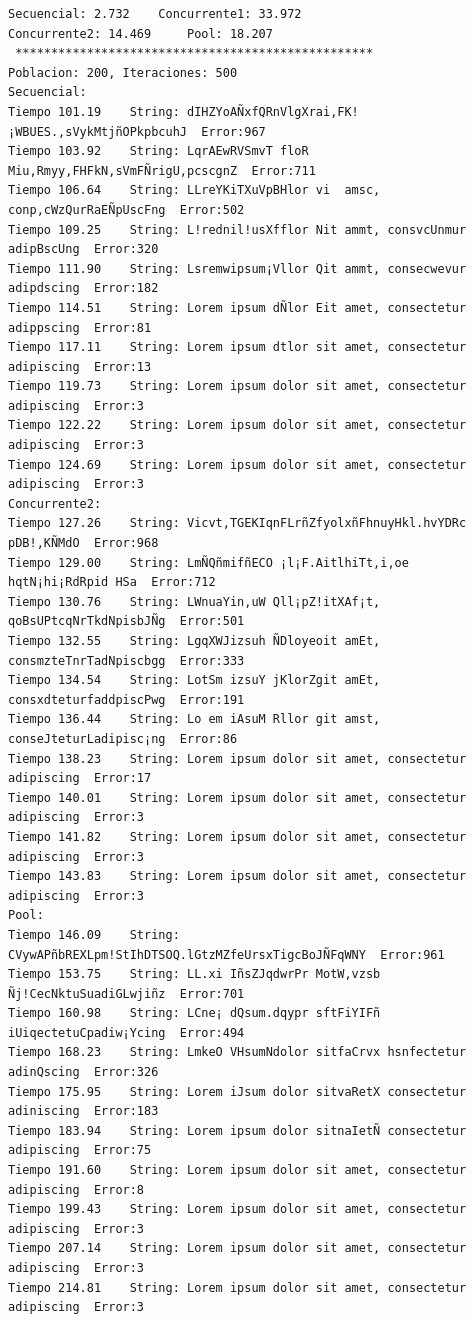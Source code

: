 \documentclass[a4paper,twocolumn,10pt]{article}
\begin{document}
\begin{center}
{\begin{verbatim}
Secuencial: 2.732	 Concurrente1: 33.972
Concurrente2: 14.469	 Pool: 18.207 
 **************************************************
Poblacion: 200, Iteraciones: 500
Secuencial:
Tiempo 101.19	 String: dIHZYoAÑxfQRnVlgXrai,FK! ¡WBUES.,sVykMtjñOPkpbcuhJ	 Error:967
Tiempo 103.92	 String: LqrAEwRVSmvT floR Miu,Rmyy,FHFkN,sVmFÑrigU,pcscgnZ	 Error:711
Tiempo 106.64	 String: LLreYKiTXuVpBHlor vi  amsc, conp,cWzQurRaEÑpUscFng	 Error:502
Tiempo 109.25	 String: L!rednil!usXfflor Nit ammt, consvcUnmur adipBscUng	 Error:320
Tiempo 111.90	 String: Lsremwipsum¡Vllor Qit ammt, consecwevur adipdscing	 Error:182
Tiempo 114.51	 String: Lorem ipsum dÑlor Eit amet, consectetur adippscing	 Error:81
Tiempo 117.11	 String: Lorem ipsum dtlor sit amet, consectetur adipiscing	 Error:13
Tiempo 119.73	 String: Lorem ipsum dolor sit amet, consectetur adipiscing	 Error:3
Tiempo 122.22	 String: Lorem ipsum dolor sit amet, consectetur adipiscing	 Error:3
Tiempo 124.69	 String: Lorem ipsum dolor sit amet, consectetur adipiscing	 Error:3
Concurrente2:
Tiempo 127.26	 String: Vicvt,TGEKIqnFLrñZfyolxñFhnuyHkl.hvYDRc pDB!,KÑMdO	 Error:968
Tiempo 129.00	 String: LmÑQñmifñECO ¡l¡F.AitlhiTt,i,oe hqtN¡hi¡RdRpid HSa	 Error:712
Tiempo 130.76	 String: LWnuaYin,uW Qll¡pZ!itXAf¡t, qoBsUPtcqNrTkdNpisbJÑg	 Error:501
Tiempo 132.55	 String: LgqXWJizsuh ÑDloyeoit amEt, consmzteTnrTadNpiscbgg	 Error:333
Tiempo 134.54	 String: LotSm izsuY jKlorZgit amEt, consxdteturfaddpiscPwg	 Error:191
Tiempo 136.44	 String: Lo em iAsuM Rllor git amst, conseJteturLadipisc¡ng	 Error:86
Tiempo 138.23	 String: Lorem ipsum dolor sit amet, consectetur adipiscing	 Error:17
Tiempo 140.01	 String: Lorem ipsum dolor sit amet, consectetur adipiscing	 Error:3
Tiempo 141.82	 String: Lorem ipsum dolor sit amet, consectetur adipiscing	 Error:3
Tiempo 143.83	 String: Lorem ipsum dolor sit amet, consectetur adipiscing	 Error:3
Pool:
Tiempo 146.09	 String: CVywAPñbREXLpm!StIhDTSOQ.lGtzMZfeUrsxTigcBoJÑFqWNY	 Error:961
Tiempo 153.75	 String: LL.xi IñsZJqdwrPr MotW,vzsb Ñj!CecNktuSuadiGLwjiñz	 Error:701
Tiempo 160.98	 String: LCne¡ dQsum.dqypr sftFiYIFñ iUiqectetuCpadiw¡Ycing	 Error:494
Tiempo 168.23	 String: LmkeO VHsumNdolor sitfaCrvx hsnfectetur adinQscing	 Error:326
Tiempo 175.95	 String: Lorem iJsum dolor sitvaRetX consectetur adiniscing	 Error:183
Tiempo 183.94	 String: Lorem ipsum dolor sitnaIetÑ consectetur adipiscing	 Error:75
Tiempo 191.60	 String: Lorem ipsum dolor sit amet, consectetur adipiscing	 Error:8
Tiempo 199.43	 String: Lorem ipsum dolor sit amet, consectetur adipiscing	 Error:3
Tiempo 207.14	 String: Lorem ipsum dolor sit amet, consectetur adipiscing	 Error:3
Tiempo 214.81	 String: Lorem ipsum dolor sit amet, consectetur adipiscing	 Error:3


\end{verbatim}}
\end{center}
\end{document}
